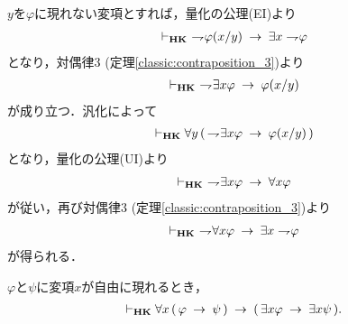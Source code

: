 	\begin{sketch}
		$y$を$\varphi$に現れない変項とすれば，量化の公理(EI)より
		\begin{align}
			\vdash_{{\scriptsize \mbox{{\bf HK}}}}\ \rightharpoondown\hspace{-0.25em} \varphi(x/y) \hspace{0.25em}\rightarrow\hspace{0.25em} \exists x \rightharpoondown\hspace{-0.25em} \varphi
		\end{align}
		となり，対偶律3 (定理\ref{classic:contraposition_3})より
		\begin{align}
			\provable{\mbox{{\bf HK}}}\ 
			\negation \exists x \varphi \rarrow \varphi(x/y)
		\end{align}
		が成り立つ．汎化によって
		\begin{align}
			\vdash_{{\scriptsize \mbox{{\bf HK}}}}
			\forall y\, (\, \rightharpoondown\hspace{-0.25em} \exists x \varphi \hspace{0.25em}\rightarrow\hspace{0.25em} \varphi(x/y)\, )
		\end{align}
		となり，量化の公理(UI)より
		\begin{align}
			\provable{\mbox{{\bf HK}}}\ 
			\negation \exists x \varphi \rarrow \forall x \varphi
		\end{align}
		が従い，再び対偶律3 (定理\ref{classic:contraposition_3})より
		\begin{align}
			\vdash_{{\scriptsize \mbox{{\bf HK}}}}\ \rightharpoondown\hspace{-0.25em} \forall x \varphi \hspace{0.25em}\rightarrow\hspace{0.25em} \exists x \rightharpoondown\hspace{-0.25em} \varphi
		\end{align}
		が得られる．
		\QED
	\end{sketch}
	
	\begin{screen}
		\begin{thm}
			$\varphi$と$\psi$に変項$x$が自由に現れるとき，
			\begin{align}
				\vdash_{{\scriptsize \mbox{{\bf HK}}}} \forall x\, (\, \varphi \hspace{0.25em}\rightarrow\hspace{0.25em} \psi\, )
				\hspace{0.25em}\rightarrow\hspace{0.25em} (\, \exists x \varphi \hspace{0.25em}\rightarrow\hspace{0.25em} \exists x \psi\, ).
			\end{align}
		\end{thm}
	\end{screen}
	
